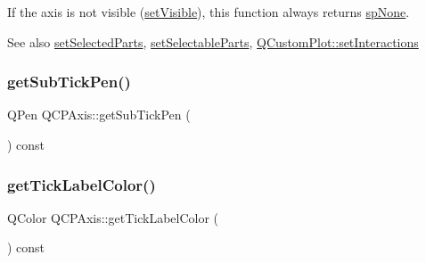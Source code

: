 If the axis is not visible (\hyperlink{class_q_c_p_layerable_a3bed99ddc396b48ce3ebfdc0418744f8}{set\+Visible}), this function always returns \hyperlink{class_q_c_p_axis_abee4c7a54c468b1385dfce2c898b115fae0df8123a5528d5ccf87cb7794f971ea}{sp\+None}.

\begin{DoxySeeAlso}{See also}
\hyperlink{class_q_c_p_axis_ab9d7a69277dcbed9119b3c1f25ca19c3}{set\+Selected\+Parts}, \hyperlink{class_q_c_p_axis_a513f9b9e326c505d9bec54880031b085}{set\+Selectable\+Parts}, \hyperlink{class_q_custom_plot_a5ee1e2f6ae27419deca53e75907c27e5}{Q\+Custom\+Plot\+::set\+Interactions} 
\end{DoxySeeAlso}
\mbox{\label{class_q_c_p_axis_aad7739c229b292ddab0b3a43a5676f54}} 
\subsubsection{\texorpdfstring{get\+Sub\+Tick\+Pen()}{getSubTickPen()}}
{\footnotesize\ttfamily Q\+Pen Q\+C\+P\+Axis\+::get\+Sub\+Tick\+Pen (\begin{DoxyParamCaption}{ }\end{DoxyParamCaption}) const\hspace{0.3cm}{\ttfamily [protected]}}

\mbox{\label{class_q_c_p_axis_a8d00d5b78ecfbebbea5a8161bddb9a17}} 
\subsubsection{\texorpdfstring{get\+Tick\+Label\+Color()}{getTickLabelColor()}}
{\footnotesize\ttfamily Q\+Color Q\+C\+P\+Axis\+::get\+Tick\+Label\+Color (\begin{DoxyParamCaption}{ }\end{DoxyParamCaption}) const\hspace{0.3cm}{\ttfamily [protected]}}

\mbox{\label{class_q_c_p_axis_a694ab8b4240f3c90a866372e3dcb364f}} 
